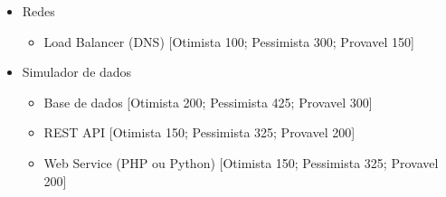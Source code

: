 \documentclass[a4paper]{report}
\begin{document}
\begin{itemize}
\begin{itemize}
    \end{itemize}
\item Redes
    \begin{itemize}
    \item Load Balancer (DNS) [Otimista 100; Pessimista 300; Provavel 150]
    \end{itemize}
\item Simulador de dados
    \begin{itemize}
    \item Base de dados [Otimista 200; Pessimista 425; Provavel 300]
    \item REST API [Otimista 150; Pessimista 325; Provavel 200]
    \item Web Service (PHP ou Python) [Otimista 150; Pessimista 325; Provavel 200]
    \end{itemize}
\end{itemize}
\end{document}
